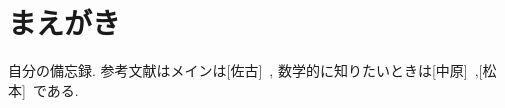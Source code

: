 \documentclass[../main]{subfiles}
\begin{document}
\chapter*{まえがき}
    自分の備忘録. 
    参考文献はメインは[佐古]~\cite{Sako2021}, 数学的に知りたいときは[中原]~\cite{Nakahara2018},[松本]~\cite{Matsumoto1988}である. 
\end{document}

